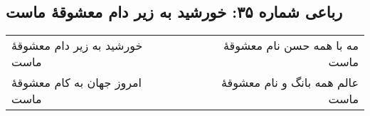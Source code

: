 \begin{center}
\section*{رباعی شماره ۳۵: خورشید به زیر دام معشوقهٔ ماست}
\label{sec:sh035}
\begin{longtable}{l p{0.5cm} r}
خورشید به زیر دام معشوقهٔ ماست
&&
مه با همه حسن نام معشوقهٔ ماست
\\
امروز جهان به کام معشوقهٔ ماست
&&
عالم همه بانگ و نام معشوقهٔ ماست
\\
\end{longtable}
\end{center}
